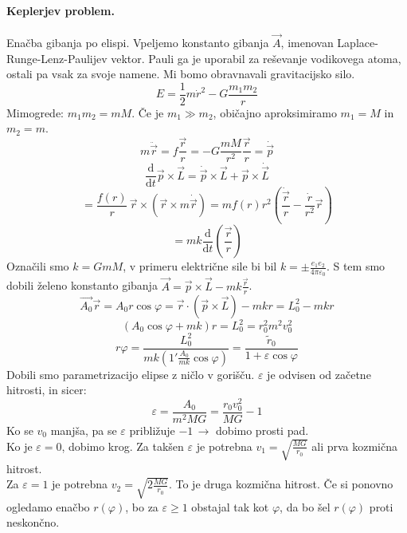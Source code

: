 \documentclass[a4paper]{article}
\newcommand{\vct}[1]{\overrightarrow{#1}}
\newcommand{\dd}[2]{\frac{\mathrm{d} {#1}}{\mathrm{d} {#2}}}
\begin{document}
\paragraph{Keplerjev problem.} Enačba gibanja po elispi. Vpeljemo konstanto gibanja $\vct{A}$, imenovan Laplace-Runge-Lenz-Paulijev vektor. Pauli ga je uporabil za
reševanje vodikovega atoma, ostali pa vsak za svoje namene. Mi bomo obravnavali gravitacijsko silo.
$$E = \frac{1}{2}m\dot{r}^2 - G\frac{m_1m_2}{r}$$
Mimogrede: $m_1m_2 = mM$. Če je $m_1 \gg m_2$, običajno aproksimiramo $m_1 = M$ in $m_2 = m$.
$$m\ddot{\vct{r}} = f\frac{\vct{r}}{r} = -G\frac{mM}{r^2}\frac{\vct{r}}{r} = \dot{\vct{p}}$$
$$\dd{}{t}\vct{p}\times\vct{L} = \dot{\vct{p}}\times\vct{L} + \vct{p}\times\dot{\vct{L}}$$
$$= \frac{f(r)}{r} \,\vct{r}\times(\vct{r}\times m\dot{\vct{r}}) = mf(r)r^2\left(\frac{\dot{\vct{r}}}{r} - \frac{\dot{r}}{r^2}\vct{r}\right)$$
$$= mk\dd{}{t}\left(\frac{\vct{r}}{r}\right)$$
Označili smo $k = GmM$, v primeru električne sile bi bil $\displaystyle{k = \pm\frac{e_1e_2}{4\pi \varepsilon_0}}$.
S tem smo dobili želeno konstanto gibanja $\displaystyle{\vct{A} = \vct{p}\times\vct{L} - mk\frac{\vct{r}}{r}}$. \\
$$\vct{A_0}\vct{r} = A_0r\cos\varphi = \vct{r}\cdot\left(\vct{p}\times\vct{L}\right) - mkr = L_0^2 - mkr$$
$$(A_0 \cos\varphi + mk)r = L_0^2 = r_0^2m^2v_0^2$$
$$r\varphi = \frac{L_0^2}{mk\left(1 ' \frac{A_0}{mk}\cos\varphi\right)} = \frac{\tilde{r}_0}{1 + \varepsilon\cos\varphi}$$
Dobili smo parametrizacijo elipse z ničlo v gorišču. $\varepsilon$ je odvisen od začetne hitrosti, in sicer:
$$\varepsilon = \frac{A_0}{m^2MG} = \frac{r_0v_0^2}{MG} - 1$$
Ko se $v_0$ manjša, pa se $\varepsilon$ približuje $-1\,\to$ dobimo prosti pad. \\
Ko je $\varepsilon = 0$, dobimo krog. Za takšen $\varepsilon$ je potrebna $\displaystyle{v_1 = \sqrt{\frac{MG}{r_0}}}$ ali prva kozmična hitrost. \\
Za $\varepsilon = 1$ je potrebna $\displaystyle{v_2 = \sqrt{2\frac{MG}{r_0}}}$. To je druga kozmična hitrost. Če si ponovno ogledamo enačbo $r(\varphi)$, bo za $\varepsilon \geq 1$
obstajal tak kot $\varphi$, da bo šel $r(\varphi)$ proti neskončno.
\end{document}
